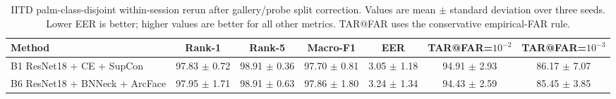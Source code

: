 \begin{table}[t]
\centering
\caption{IITD palm-class-disjoint within-session rerun after gallery/probe split correction. Values are mean $\pm$ standard deviation over three seeds. Lower EER is better; higher values are better for all other metrics. TAR@FAR uses the conservative empirical-FAR rule.}
\label{tab:iitd_rerun}
\begin{tabular}{lcccccc}
\toprule
Method & Rank-1 & Rank-5 & Macro-F1 & EER & TAR@FAR=$10^{-2}$ & TAR@FAR=$10^{-3}$ \\
\midrule
B1 ResNet18 + CE + SupCon & 97.83 $\pm$ 0.72 & 98.91 $\pm$ 0.36 & 97.70 $\pm$ 0.81 & 3.05 $\pm$ 1.18 & 94.91 $\pm$ 2.93 & 86.17 $\pm$ 7.07 \\
B6 ResNet18 + BNNeck + ArcFace & 97.95 $\pm$ 1.71 & 98.91 $\pm$ 0.63 & 97.86 $\pm$ 1.80 & 3.24 $\pm$ 1.34 & 94.43 $\pm$ 2.59 & 85.45 $\pm$ 3.85 \\
\bottomrule
\end{tabular}
\end{table}
